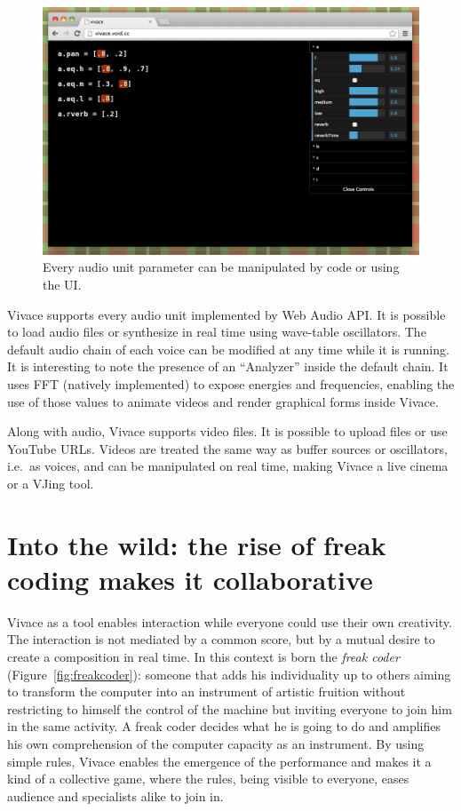 \documentclass[letterpaper, 12pt]{article}
\begin{document}
\begin{figure}[htpb]
  \begin{center}
    \includegraphics[scale=.4]{img/fig_ui.png}
    \caption{Every audio unit parameter can be manipulated by code or
      using the UI.}
    \label{fig:ui}
  \end{center}
\end{figure}

Vivace supports every audio unit implemented by Web Audio API. It is
possible to load audio files or synthesize in real time using
wave-table oscillators. The default audio chain of each voice can be
modified at any time while it is running. It is interesting to note
the presence of an ``Analyzer'' inside the default chain. It uses FFT
(natively implemented) to expose energies and frequencies, enabling
the use of those values to animate videos and render graphical forms
inside Vivace.

Along with audio, Vivace supports video files. It is possible to
upload files or use YouTube URLs. Videos are treated the same way as
buffer sources or oscillators, i.e.\ as voices, and can be manipulated
on real time, making Vivace a live cinema or a VJing tool.

\section{Into the wild: the rise of freak coding makes it collaborative}

Vivace as a tool enables interaction while everyone could use their
own creativity. The interaction is not mediated by a common score, but
by a mutual desire to create a composition in real time. In this
context is born the \emph{freak coder} (Figure~\ref{fig:freakcoder}):
someone that adds his individuality up to others aiming to transform
the computer into an instrument of artistic fruition without
restricting to himself the control of the machine but inviting
everyone to join him in the same activity. A freak coder decides what
he is going to do and amplifies his own comprehension of the computer
capacity as an instrument. By using simple rules, Vivace enables the
emergence of the performance and makes it a kind of a collective game,
where the rules, being visible to everyone, eases audience and
specialists alike to join in.
\end{document}
